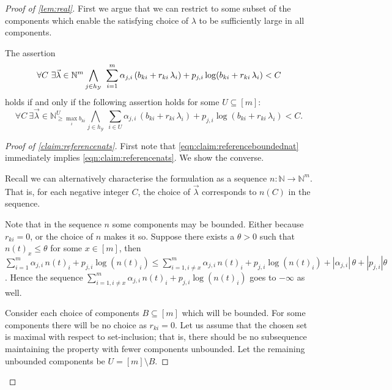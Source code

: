 \documentclass{lmcs}
\theoremstyle{plain}
\theoremstyle{definition}
\theoremstyle{remark}
\newenvironment{subproof}[1][\proofname]{\renewcommand{\qedsymbol}{{$\blacksquare$}}\begin{proof}[#1]}{\end{proof}}
\newcommand\basevecraw{b}
\newcommand\pvecraw{r}
\begin{document}
\begin{proof}[Proof of \cref{lem:real}]

First we argue that we can restrict to some subset of the components which enable the satisfying choice of $\lambda$ to be sufficiently large in all components.
\begin{clm} \label{claim:referencenats}
The assertion
\begin{equation}\label{eqn:claim:referencenats}
\forall C\  \exists \vec{\lambda} \in \mathbb{N}^m \\
\bigwedge_{j \in h_\mathcal{Y}}\ \sum_{i=1}^m \alpha_{j,i}\, (\basevecraw_{ki} + \pvecraw_{ki} \, \lambda_i) +  p_{j,i}\log(\basevecraw_{ki} + \pvecraw_{ki}\, \lambda_i) < C
\end{equation}
 holds if and only if the following assertion holds for some $U \subseteq [m]$:\begin{equation}\label{eqn:claim:referenceboundednat}
\forall C\  \exists \vec{\lambda} \in \mathbb{N}^{U}_{\ge \max_i{\basevecraw_{ki}}}
\bigwedge_{j \in h_\mathcal{Y}}\ \sum_{i \in U} \alpha_{j,i}\, (\basevecraw_{ki} + \pvecraw_{ki}\, \lambda_i) +  p_{j,i}\log(\basevecraw_{ki} + \pvecraw_{ki}\, \lambda_i) < C.
\end{equation}
\end{clm}
\begin{subproof}[Proof of \cref{claim:referencenats}]

First note that \cref{eqn:claim:referenceboundednat} immediately implies \cref{eqn:claim:referencenats}. We show the converse.

Recall we can alternatively characterise the formulation as a sequence $n: \mathbb{N} \to \mathbb{N}^m$. That is, for each negative integer $C$, the choice of  $\vec{\lambda}$ corresponds to $n(C)$ in the sequence.

Note that in the sequence $n$ some components may be bounded. Either because $\pvecraw_{ki}=0$, or the choice of $n$ makes it so. Suppose there exists a $\theta >0$ such that $n(t)_x \le \theta$ for some $x \in [m]$, then  $\sum_{i = 1}^m \alpha_{j,i}\, n(t)_i +  p_{j,i}\log(n(t)_i) \le \sum_{i = 1, i\ne x}^m \alpha_{j,i}\, n(t)_i +  p_{j,i}\log(n(t)_i) + |\alpha_{j,i}|\, \theta +  |p_{j,i}|\theta$. Hence the sequence  $\sum_{i = 1, i\ne x}^m \alpha_{j,i}\, n(t)_i +  p_{j,i}\log(n(t)_i)$ goes to $-\infty$ as well.

Consider each choice of components $B \subseteq [m]$ which will be bounded. For some components there will be no choice as $\pvecraw_{ki} = 0$. Let us assume that the chosen set is maximal with respect to set-inclusion; that is, there should be no subsequence maintaining the property with fewer components unbounded. Let the remaining unbounded components be $U = [m] \setminus B$.


\end{subproof}
\end{proof}
\end{document}
